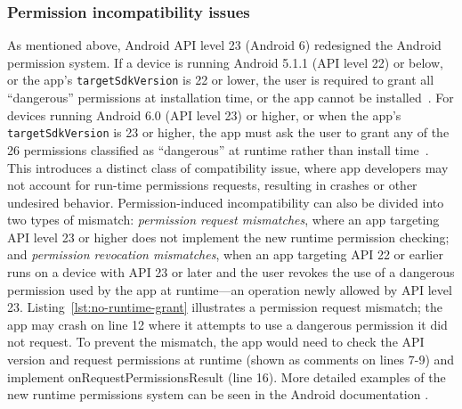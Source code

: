 \subsubsection{Permission incompatibility issues} \label{sec-background:prm}

As mentioned above, Android API level 23 (Android 6) redesigned the Android permission system.
If a device is running Android 5.1.1 (API level 22) or below, or the app's {\tt targetSdkVersion} is 22 or lower, the user is required to grant all ``dangerous'' permissions at installation time, or the app cannot be installed~\cite{permissiongroups}. 
For devices running Android 6.0 (API level 23) or higher, or when the app's {\tt targetSdkVersion} is 23 or higher, the app must ask the user to grant any of the 26 permissions classified as ``dangerous'' at runtime rather than install time~\cite{runtimepermissions}.
This introduces a distinct class of compatibility issue, where app developers may not account for run-time permissions requests, resulting in crashes or other undesired behavior.
Permission-induced incompatibility can also be divided into
two types of mismatch: {\it permission request mismatches},
where an app targeting API level 23 or higher does not
implement the new runtime permission checking; and {\it
permission revocation mismatches}, when an app targeting API
22 or earlier runs on a device with API 23 or later and the 
user revokes the use of a dangerous permission used by 
the app at runtime---an operation newly allowed by API level 23.
Listing~\ref{lst:no-runtime-grant} illustrates a permission
request mismatch; the app may crash on line 12 where it
attempts to use a dangerous permission it did not request.
To prevent the mismatch, the app would need to check the API
version and request permissions at runtime (shown as
comments on lines 7-9) and implement {\sf
onRequestPermissionsResult} (line 16). More detailed
examples of the new runtime permissions system can be seen
in the Android documentation \cite{runtimepermissions}.
\begin{figure}[t]%
     
\end{figure}

